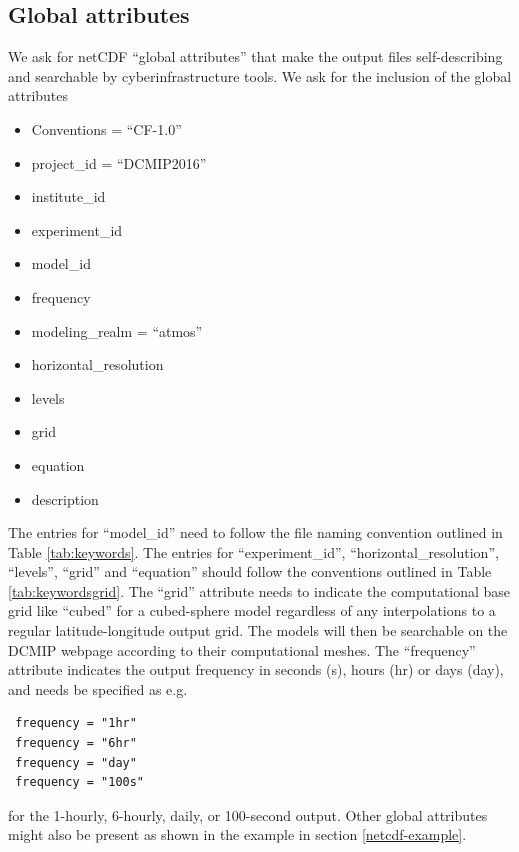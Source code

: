 \documentclass[times,doublespace]{fldauth}
\begin{document}
{\begin{appendix}
\subsection{Global attributes}
We ask for netCDF ``global attributes'' that make the output files self-describing and searchable by cyberinfrastructure tools. We ask for the inclusion of the global attributes
\begin{itemize}
\item Conventions = ``CF-1.0''
\item project\_id = ``DCMIP2016''
\item institute\_id
\item experiment\_id
\item model\_id
\item frequency
\item modeling\_realm = ``atmos''
\item horizontal\_resolution
\item levels
\item grid
\item equation
\item description
\end{itemize}
The entries for ``model\_id'' need to follow the file naming convention outlined in Table \ref{tab:keywords}.  The entries for ``experiment\_id'', ``horizontal\_resolution'', ``levels'', ``grid'' and ``equation'' should follow the conventions outlined in Table \ref{tab:keywordsgrid}. The ``grid'' attribute needs to indicate the computational base grid like ``cubed'' for a cubed-sphere model regardless of any interpolations to a regular latitude-longitude output grid. The models will then be searchable on the DCMIP webpage according to their computational meshes.
The ``frequency'' attribute indicates the output frequency in seconds (s), hours (hr) or days (day), and needs be specified as e.g.
\begin{verbatim}
 frequency = "1hr"
 frequency = "6hr"
 frequency = "day"
 frequency = "100s"
 \end{verbatim}
for the 1-hourly, 6-hourly, daily, or 100-second output.  Other global attributes might also be present as shown in the example in section \ref{netcdf-example}.


\end{appendix}}
\end{document}
